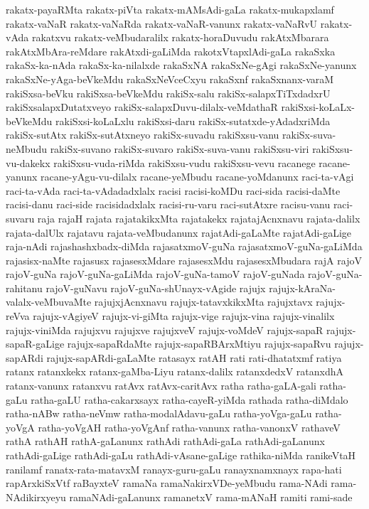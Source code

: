 {rakatx-payaRMta
rakatx-piVta
rakatx-mAMsAdi-gaLa
rakatx-mukapxlamf
rakatx-vaNaR
rakatx-vaNaRda
rakatx-vaNaR-vanunx
rakatx-vaNaRvU
rakatx-vAda
rakatxvu
rakatx-veMbudaralilx
rakatx-horaDuvudu
rakAtxMbarara
rakAtxMbAra-reMdare
rakAtxdi-gaLiMda
rakotxVtapxlAdi-gaLa
rakaSxka
rakaSx-ka-nAda
rakaSx-ka-nilalxde
rakaSxNA
rakaSxNe-gAgi
rakaSxNe-yanunx
rakaSxNe-yAga-beVkeMdu
rakaSxNeVceCxyu
rakaSxnf
rakaSxnanx-varaM
rakiSxsa-beVku
rakiSxsa-beVkeMdu
rakiSx-salu
rakiSx-salapxTiTxdadxrU
rakiSxsalapxDutatxveyo
rakiSx-salapxDuvu-dilalx-veMdathaR
rakiSxsi-koLaLx-beVkeMdu
rakiSxsi-koLaLxlu
rakiSxsi-daru
rakiSx-sutatxde-yAdadxriMda
rakiSx-sutAtx
rakiSx-sutAtxneyo
rakiSx-suvadu
rakiSxsu-vanu
rakiSx-suva-neMbudu
rakiSx-suvano
rakiSx-suvaro
rakiSx-suva-vanu
rakiSxsu-viri
rakiSxsu-vu-dakekx
rakiSxsu-vuda-riMda
rakiSxsu-vudu
rakiSxsu-vevu
racanege
racane-yanunx
racane-yAgu-vu-dilalx
racane-yeMbudu
racane-yoMdanunx
raci-ta-vAgi
raci-ta-vAda
raci-ta-vAdadadxlalx
racisi
racisi-koMDu
raci-sida
racisi-daMte
racisi-danu
raci-side
racisidadxlalx
racisi-ru-varu
raci-sutAtxre
racisu-vanu
raci-suvaru
raja
rajaH
rajata
rajatakikxMta
rajatakekx
rajatajAcnxnavu
rajata-dalilx
rajata-dalUlx
rajatavu
rajata-veMbudanunx
rajatAdi-gaLaMte
rajatAdi-gaLige
raja-nAdi
rajashashxbadx-diMda
rajasatxmoV-guNa
rajasatxmoV-guNa-gaLiMda
rajasisx-naMte
rajasusx
rajasesxMdare
rajasesxMdu
rajasesxMbudara
rajA
rajoV
rajoV-guNa
rajoV-guNa-gaLiMda
rajoV-guNa-tamoV
rajoV-guNada
rajoV-guNa-rahitanu
rajoV-guNavu
rajoV-guNa-shUnayx-vAgide
rajujx
rajujx-kAraNa-valalx-veMbuvaMte
rajujxjAcnxnavu
rajujx-tatavxkikxMta
rajujxtavx
rajujx-reVva
rajujx-vAgiyeV
rajujx-vi-giMta
rajujx-vige
rajujx-vina
rajujx-vinalilx
rajujx-viniMda
rajujxvu
rajujxve
rajujxveV
rajujx-voMdeV
rajujx-sapaR
rajujx-sapaR-gaLige
rajujx-sapaRdaMte
rajujx-sapaRBArxMtiyu
rajujx-sapaRvu
rajujx-sapARdi
rajujx-sapARdi-gaLaMte
ratasayx
ratAH
rati
rati-dhatatxmf
ratiya
ratanx
ratanxkekx
ratanx-gaMba-Liyu
ratanx-dalilx
ratanxdedxV
ratanxdhA
ratanx-vanunx
ratanxvu
ratAvx
ratAvx-caritAvx
ratha
ratha-gaLA-gali
ratha-gaLu
ratha-gaLU
ratha-cakarxsayx
ratha-cayeR-yiMda
rathada
ratha-diMdalo
ratha-nABw
ratha-neVmw
ratha-modalAdavu-gaLu
ratha-yoVga-gaLu
ratha-yoVgA
ratha-yoVgAH
ratha-yoVgAnf
ratha-vanunx
ratha-vanonxV
rathaveV
rathA
rathAH
rathA-gaLanunx
rathAdi
rathAdi-gaLa
rathAdi-gaLanunx
rathAdi-gaLige
rathAdi-gaLu
rathAdi-vAsane-gaLige
rathika-niMda
ranikeVtaH
ranilamf
ranatx-rata-matavxM
ranayx-guru-gaLu
ranayxnamxnayx
rapa-hati
rapArxkiSxVtf
raBayxteV
ramaNa
ramaNakirxVDe-yeMbudu
rama-NAdi
rama-NAdikirxyeyu
ramaNAdi-gaLanunx
ramanetxV
rama-mANaH
ramiti
rami-sade
}
